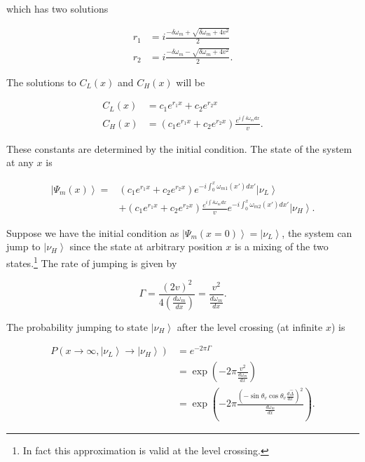 \documentclass{tufte-handout}
\newcommand{\ket}[1]{\left| #1\right\rangle}
\begin{document}
which has two solutions

\begin{align*}
r_1 & =  i \frac{-\delta\omega_m + \sqrt{\delta\omega_m+ 4v^2} }{2} \\
r_2 & = i\frac{-\delta\omega_m - \sqrt{\delta\omega_m+ 4v^2} }{2}.
\end{align*}

The solutions to $C_L(x)$ and $C_H(x)$ will be

\begin{align*}
C_L(x) & = c_1 e^{r_1 x} + c_2 e^{r_2 x} \\
C_H(x) & = \left( c_1 e^{r_1 x} + c_2 e^{r_2 x} \right) \frac{ e^{ i\int \delta\omega_m dx } }{v} .
\end{align*}

These constants are determined by the initial condition. The state of the system at any $x$ is

\begin{align*}
\ket{\Psi_m(x)} = & \left( c_1 e^{r_1 x} + c_2 e^{r_2 x} \right) e^{-i\int_0^x \omega_{m1}(x') dx'} \ket{\nu_L}  \\
& + \left( c_1 e^{r_1 x} + c_2 e^{r_2 x} \right) \frac{ e^{ i\int \delta\omega_m dx } }{v} e^{-i\int_0^x \omega_{m2}(x') dx'} \ket{\nu_H}.
\end{align*}


Suppose we have the initial condition as $\ket{\Psi_m(x=0)} = \ket{\nu_L}$, the system can jump to $\ket{\nu_H}$ since the state at arbitrary position $x$ is a mixing of the two states.\footnote{In fact this approximation is valid at the level crossing.} The rate of jumping is given by\cite{Vutha2010,Zener1932,Rubbmark1981}

\begin{equation*}
\Gamma = \frac{(2v )^2}{4\left( \frac{d\omega_m}{dx} \right)} = \frac{v^2}{\frac{d\omega_m}{dx}}.
\end{equation*}


The probability jumping to state $\ket{\nu_H}$ after the level crossing (at infinite $x$) is

\begin{align*}
P(x\to \infty, \ket{\nu_L}\to\ket{\nu_H}) &= e^{-2\pi\Gamma} \\
& = \exp\left( -2\pi \frac{v^2}{\frac{d\omega_m}{dx}} \right) \\
& = \exp\left( -2\pi \frac{\left( -\sin\theta_v\cos\theta_v \frac{d\hat\Delta}{dx}  \right)^2}{\frac{d\omega_m}{dx}} \right).
\end{align*}
\end{document}
